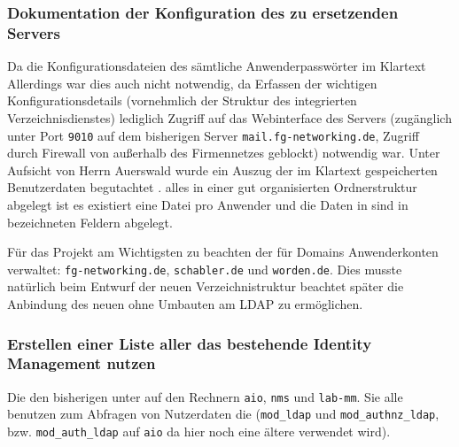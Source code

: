 \documentclass[11pt,a4paper,titlepage=firstiscover]{scrartcl} %
\begin{document}
\subsubsection{Dokumentation der Konfiguration des zu ersetzenden Servers}\label{sec:Konfig-Doku-Alt}
Da die Konfigurationsdateien des  sämtliche 
Anwenderpasswörter im Klartext  Allerdings war dies  auch nicht notwendig, da  
Erfassen der wichtigen Konfigurationsdetails (vornehmlich der Struktur des 
integrierten Verzeichnisdienstes) lediglich Zugriff auf das Webinterface des 
Servers (zugänglich unter Port \texttt{9010} auf dem bisherigen Server 
\texttt{mail.fg-networking.de}, Zugriff durch Firewall von außerhalb des 
Firmennetzes geblockt) notwendig war. Unter Aufsicht von Herrn Auerswald wurde 
ein Auszug der im Klartext gespeicherten Benutzerdaten begutachtet . 
 alles in 
einer gut organisierten Ordnerstruktur abgelegt ist\tcr{,$\to$;} es existiert 
eine Datei pro Anwender und die Daten in  sind in 
bezeichneten Feldern abgelegt.

Für das Projekt am Wichtigsten zu beachten  der 
 für  Domains 
Anwenderkonten verwaltet: \texttt{fg-networking.de}, \texttt{schabler.de} und 
\texttt{worden.de}. Dies musste natürlich beim Entwurf der neuen 
Verzeichnistruktur beachtet  später die Anbindung des neuen 
 ohne  Umbauten am LDAP zu ermöglichen.

\subsubsection{Erstellen einer Liste aller  das bestehende 
		Identity Management nutzen}
Die  den bisherigen   
unter  auf den Rechnern \texttt{aio}, \texttt{nms} und 
\texttt{lab-mm}. Sie alle benutzen zum Abfragen von Nutzerdaten die   (\texttt{mod\_ldap} und 
\texttt{mod\_authnz\_ldap}, bzw. \texttt{mod\_auth\_ldap} auf \texttt{aio} da 
hier noch eine ältere  verwendet wird). 
\end{document}
